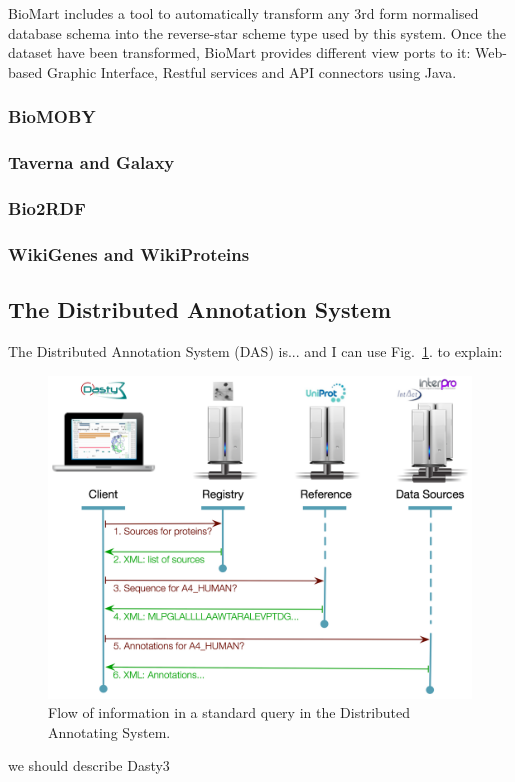 BioMart includes a tool to automatically transform any 3rd form normalised database schema into the reverse-star scheme type used by this system. Once the dataset have been transformed, BioMart provides different view ports to it: Web-based Graphic Interface, Restful services and API connectors using Java.



\subsubsection{BioMOBY}
\subsubsection{Taverna and Galaxy}
\subsubsection{Bio2RDF}
\subsubsection{WikiGenes and WikiProteins}

\subsection{The Distributed Annotation System}
The Distributed Annotation System (DAS) is... \cite{JEN2008} and I can use Fig.~\ref{fig:das}. to explain:
\begin{figure}  
\includegraphics[width=\textwidth]{figures/DAS.png}
\caption[DAS Flow of Information.]{Flow of information in a standard query in the Distributed Annotating System.
\label{fig:das}}
\end{figure}
we should describe Dasty3 \cite{VIL2011}

